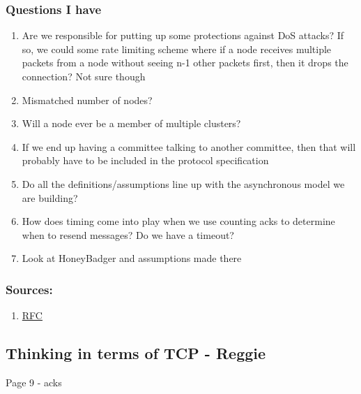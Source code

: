 \subsubsection{Questions I have}
\begin{enumerate}
    \item Are we responsible for putting up some protections against DoS attacks? If so, we could some rate limiting scheme where if a node receives multiple packets from a node without seeing n-1 other packets first, then it drops the connection? Not sure though
    \item Mismatched number of nodes?
    \item Will a node ever be a member of multiple clusters?
    \item If we end up having a committee talking to another committee, then that will probably have to be included in the protocol specification
    \item Do all the definitions/assumptions line up with the asynchronous model we are building?
    \item How does timing come into play when we use counting acks to determine when to resend messages? Do we have a timeout?
    \item Look at HoneyBadger and assumptions made there
\end{enumerate}

\subsubsection{Sources:}
\begin{enumerate}
    \item \href{https://www.ietf.org/rfc/rfc793.txt}{RFC}
\end{enumerate}

\subsection{Thinking in terms of TCP - Reggie}
Page 9 - acks 
